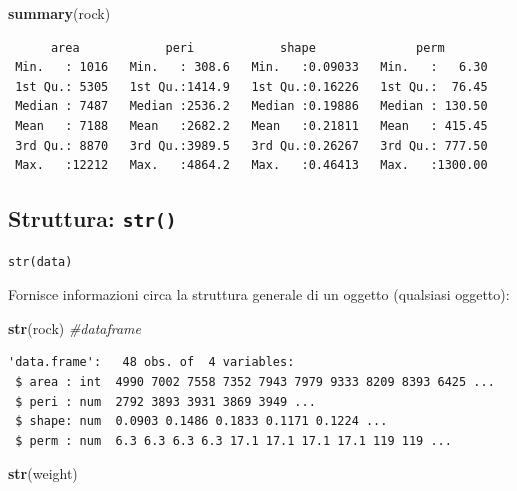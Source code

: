 \documentclass[
  a4paper,
  DIV=11,
  numbers=noendperiod]{scrreprt}
\newenvironment{Shaded}{\begin{snugshade}}{\end{snugshade}}
\newcommand{\CommentTok}[1]{\textcolor[rgb]{0.56,0.35,0.01}{\textit{#1}}}
\newcommand{\FunctionTok}[1]{\textcolor[rgb]{0.13,0.29,0.53}{\textbf{#1}}}
\newcommand{\NormalTok}[1]{#1}
\begin{document}
\begin{Shaded}
\begin{Highlighting}[]
\FunctionTok{summary}\NormalTok{(rock)}
\end{Highlighting}
\end{Shaded}

\begin{verbatim}
      area            peri            shape              perm        
 Min.   : 1016   Min.   : 308.6   Min.   :0.09033   Min.   :   6.30  
 1st Qu.: 5305   1st Qu.:1414.9   1st Qu.:0.16226   1st Qu.:  76.45  
 Median : 7487   Median :2536.2   Median :0.19886   Median : 130.50  
 Mean   : 7188   Mean   :2682.2   Mean   :0.21811   Mean   : 415.45  
 3rd Qu.: 8870   3rd Qu.:3989.5   3rd Qu.:0.26267   3rd Qu.: 777.50  
 Max.   :12212   Max.   :4864.2   Max.   :0.46413   Max.   :1300.00  
\end{verbatim}

\subsection{\texorpdfstring{Struttura:
\texttt{str()}}{Struttura: str()}}\label{struttura-str}

\begin{verbatim}
str(data)
\end{verbatim}

Fornisce informazioni circa la struttura generale di un oggetto
(qualsiasi oggetto):

\begin{Shaded}
\begin{Highlighting}[]
\FunctionTok{str}\NormalTok{(rock) }\CommentTok{\#dataframe}
\end{Highlighting}
\end{Shaded}

\begin{verbatim}
'data.frame':   48 obs. of  4 variables:
 $ area : int  4990 7002 7558 7352 7943 7979 9333 8209 8393 6425 ...
 $ peri : num  2792 3893 3931 3869 3949 ...
 $ shape: num  0.0903 0.1486 0.1833 0.1171 0.1224 ...
 $ perm : num  6.3 6.3 6.3 6.3 17.1 17.1 17.1 17.1 119 119 ...
\end{verbatim}

\begin{Shaded}
\begin{Highlighting}[]
\FunctionTok{str}\NormalTok{(weight)}
\end{Highlighting}
\end{Shaded}
\end{document}
